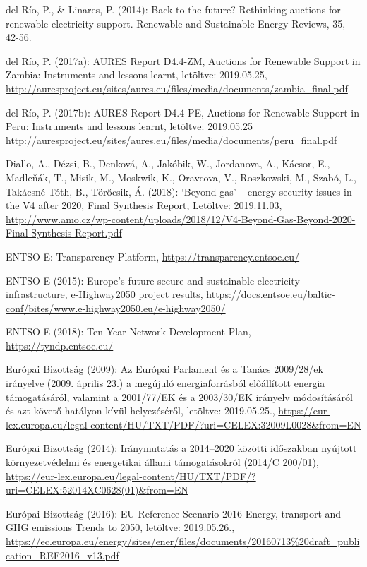 \documentclass[twoside, magyar, showtrims]{corvinusphd}
\theoremstyle{plain}
\theoremstyle{remark}
\theoremstyle{definition}
\begin{document}
\begin{thebibliography}{99}
del Río, P., \& Linares, P. (2014): Back to the future? Rethinking auctions for renewable electricity support. Renewable and Sustainable Energy Reviews, 35, 42-56.

del Río, P. (2017a): AURES Report D4.4-ZM,  Auctions for Renewable  Support in Zambia: Instruments and lessons learnt, letöltve: 2019.05.25,
\url{http://auresproject.eu/sites/aures.eu/files/media/documents/zambia\_final.pdf}

del Río, P. (2017b): AURES Report D4.4-PE, Auctions for Renewable Support in Peru: Instruments and lessons learnt, letöltve: 2019.05.25
\url{http://auresproject.eu/sites/aures.eu/files/media/documents/peru\_final.pdf}

Diallo, A., Dézsi, B., Denková, A., Jakóbik, W., Jordanova, A., Kácsor, E., Madleňák, T., Misik, M., Moskwik, K.,
Oravcova, V., Roszkowski, M., Szabó, L., Takácsné Tóth, B., Törőcsik, Á. (2018): ‘Beyond gas’ – energy security issues in the V4 after 2020, Final Synthesis Report,
Letöltve: 2019.11.03,
\url{http://www.amo.cz/wp-content/uploads/2018/12/V4-Beyond-Gas-Beyond-2020-Final-Synthesis-Report.pdf}

ENTSO-E: Transparency Platform,
\url{https://transparency.entsoe.eu/}

ENTSO-E (2015): Europe’s  future  secure and  sustainable  electricity  infrastructure, e-Highway2050 project results, 
\url{https://docs.entsoe.eu/baltic-conf/bites/www.e-highway2050.eu/e-highway2050/}

ENTSO-E (2018): Ten Year Network Development Plan, 
\url{https://tyndp.entsoe.eu/}

Európai Bizottság (2009): Az Európai Parlament és a Tanács 2009/28/ek irányelve (2009. április 23.) a megújuló energiaforrásból előállított energia támogatásáról, valamint a 2001/77/EK és a 2003/30/EK irányelv módosításáról és azt követő hatályon kívül helyezéséről, letöltve: 2019.05.25., 
\url{https://eur-lex.europa.eu/legal-content/HU/TXT/PDF/?uri=CELEX:32009L0028\&from=EN}

Európai Bizottság (2014): Iránymutatás a 2014–2020 közötti időszakban nyújtott környezetvédelmi és energetikai állami támogatásokról (2014/C 200/01), 
\url{https://eur-lex.europa.eu/legal-content/HU/TXT/PDF/?uri=CELEX:52014XC0628(01)\&from=EN}

    Európai Bizottság (2016): EU Reference Scenario 2016 Energy, transport and GHG emissions Trends to 2050, letöltve: 2019.05.26.,
    \url{https://ec.europa.eu/energy/sites/ener/files/documents/20160713\%20draft\_publication\_REF2016\_v13.pdf}


\end{thebibliography}
\end{document}
